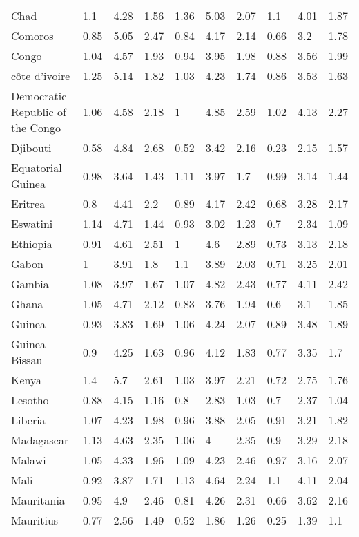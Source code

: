\begin{longtable}[t]{llllllllll}
Chad & 1.1 & 4.28 & 1.56 & 1.36 & 5.03 & 2.07 & 1.1 & 4.01 & 1.87\\
Comoros & 0.85 & 5.05 & 2.47 & 0.84 & 4.17 & 2.14 & 0.66 & 3.2 & 1.78\\
Congo & 1.04 & 4.57 & 1.93 & 0.94 & 3.95 & 1.98 & 0.88 & 3.56 & 1.99\\
côte d'ivoire & 1.25 & 5.14 & 1.82 & 1.03 & 4.23 & 1.74 & 0.86 & 3.53 & 1.63\\
Democratic Republic of the Congo & 1.06 & 4.58 & 2.18 & 1 & 4.85 & 2.59 & 1.02 & 4.13 & 2.27\\
Djibouti & 0.58 & 4.84 & 2.68 & 0.52 & 3.42 & 2.16 & 0.23 & 2.15 & 1.57\\
Equatorial Guinea & 0.98 & 3.64 & 1.43 & 1.11 & 3.97 & 1.7 & 0.99 & 3.14 & 1.44\\
Eritrea & 0.8 & 4.41 & 2.2 & 0.89 & 4.17 & 2.42 & 0.68 & 3.28 & 2.17\\
Eswatini & 1.14 & 4.71 & 1.44 & 0.93 & 3.02 & 1.23 & 0.7 & 2.34 & 1.09\\
Ethiopia & 0.91 & 4.61 & 2.51 & 1 & 4.6 & 2.89 & 0.73 & 3.13 & 2.18\\
Gabon & 1 & 3.91 & 1.8 & 1.1 & 3.89 & 2.03 & 0.71 & 3.25 & 2.01\\
Gambia & 1.08 & 3.97 & 1.67 & 1.07 & 4.82 & 2.43 & 0.77 & 4.11 & 2.42\\
Ghana & 1.05 & 4.71 & 2.12 & 0.83 & 3.76 & 1.94 & 0.6 & 3.1 & 1.85\\
Guinea & 0.93 & 3.83 & 1.69 & 1.06 & 4.24 & 2.07 & 0.89 & 3.48 & 1.89\\
Guinea-Bissau & 0.9 & 4.25 & 1.63 & 0.96 & 4.12 & 1.83 & 0.77 & 3.35 & 1.7\\
Kenya & 1.4 & 5.7 & 2.61 & 1.03 & 3.97 & 2.21 & 0.72 & 2.75 & 1.76\\
Lesotho & 0.88 & 4.15 & 1.16 & 0.8 & 2.83 & 1.03 & 0.7 & 2.37 & 1.04\\
Liberia & 1.07 & 4.23 & 1.98 & 0.96 & 3.88 & 2.05 & 0.91 & 3.21 & 1.82\\
Madagascar & 1.13 & 4.63 & 2.35 & 1.06 & 4 & 2.35 & 0.9 & 3.29 & 2.18\\
Malawi & 1.05 & 4.33 & 1.96 & 1.09 & 4.23 & 2.46 & 0.97 & 3.16 & 2.07\\
Mali & 0.92 & 3.87 & 1.71 & 1.13 & 4.64 & 2.24 & 1.1 & 4.11 & 2.04\\
Mauritania & 0.95 & 4.9 & 2.46 & 0.81 & 4.26 & 2.31 & 0.66 & 3.62 & 2.16\\
Mauritius & 0.77 & 2.56 & 1.49 & 0.52 & 1.86 & 1.26 & 0.25 & 1.39 & 1.1\\

\end{longtable}
